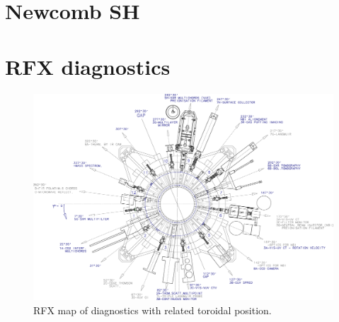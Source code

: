 
\section{Newcomb SH}


\section{RFX diagnostics}

%
\begin{figure}[ht!]
\includegraphics[width=1\textwidth]{img/rfx/Layout_Diagnosiche_AA10005.eps} \centering
\caption{RFX map of diagnostics with related toroidal position.}
\label{rfx}
\end{figure}
%

